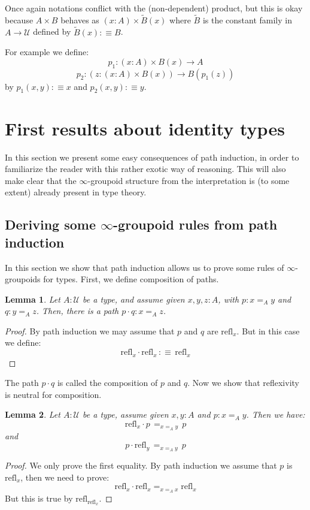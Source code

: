 \documentclass{article}
\newcommand{\se}[1]{\medbreak \medbreak \section{#1}}
\newcommand{\sse}[1]{\medbreak \subsection{#1}}
\newcommand{\U}{{\mathcal U}}
\renewcommand{\r}{\rightarrow}
\newcommand{\refl}{\mathrm{refl}}
\newtheorem{lemma}{Lemma}
\begin{document}
Once again notations conflict with the (non-dependent) product, but this is okay because $A\times B$ behaves as $(x:A)\times \tilde{B}(x)$  where $\tilde{B}$ is the constant family in $A\r \U$ defined by $\tilde{B}(x) :\equiv B$. 

For example we define: 
\[p_1 : (x:A)\times B(x)\r A\]
\[p_2 : (z:(x:A)\times B(x)) \r B(p_1(z))\]
 by $p_1(x,y) :\equiv x$ and $p_2(x,y) :\equiv y$. 




\se{First results about identity types}

In this section we present some easy consequences of path induction, in order to familiarize the reader with this rather exotic way of reasoning. This will also make clear that the $\infty$-groupoid structure from the interpretation is (to some extent) already present in type theory.


\sse{Deriving some $\infty$-groupoid rules from path induction}




In this section we show that path induction allows us to prove some rules of $\infty$-groupoids for types. First, we define composition of paths.

\begin{lemma}
Let $A:\U$ be a type, and assume given $x,y,z:A$, with $p:x=_A y$ and $q:y=_A z$. Then, there is a path $p\cdot q: x=_Az$.
\end{lemma}
\begin{proof}
By path induction we may assume that $p$ and $q$ are $\refl_x$. But in this case we define:
\[\refl_x\cdot\refl_x \, :\equiv\,  \refl_x\]
\end{proof}

The path $p\cdot q$ is called the composition of $p$ and $q$. Now we show that reflexivity is neutral for composition. 

\begin{lemma}
Let $A:\U$ be a type, assume given $x,y:A$ and $p:x=_Ay$. Then we have:
\[\refl_x\cdot p \, =_{x=_Ay}\, p\]
and
\[p\cdot \refl_y \, =_{x=_Ay}\, p\]
\end{lemma}
\begin{proof}
We only prove the first equality. By path induction we assume that $p$ is $\refl_x$, then we need to prove:
\[\refl_x\cdot\refl_x =_{x=_Ax} \refl_x\]
But this is true by $\refl_{\refl_x}$.
\end{proof}
\end{document}
